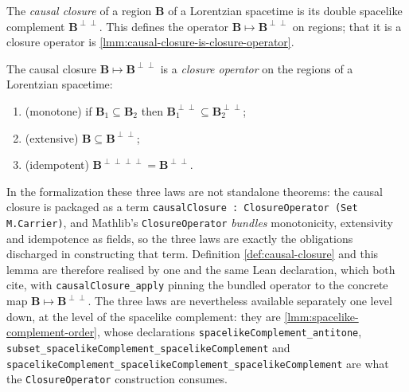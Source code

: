 \medskip

\begin{definition}
    \label{def:causal-closure}
    \leanok
    The \emph{causal closure} of a region $\mathbf{B}$ of a Lorentzian spacetime is its double spacelike complement $\mathbf{B}^{\perp\perp}$. This defines the operator $\mathbf{B} \mapsto \mathbf{B}^{\perp\perp}$ on regions; that it is a closure operator is \ref{lmm:causal-closure-is-closure-operator}.
\end{definition}

\medskip

\begin{lemma}
    \label{lmm:causal-closure-is-closure-operator}
    \leanok
    The causal closure $\mathbf{B} \mapsto \mathbf{B}^{\perp\perp}$ is a \emph{closure operator} on the regions of a Lorentzian spacetime:
    \begin{enumerate}
        \item (monotone) if $\mathbf{B}_1 \subseteq \mathbf{B}_2$ then $\mathbf{B}_1^{\perp\perp} \subseteq \mathbf{B}_2^{\perp\perp}$;
        \item (extensive) $\mathbf{B} \subseteq \mathbf{B}^{\perp\perp}$;
        \item (idempotent) $\mathbf{B}^{\perp\perp\perp\perp} = \mathbf{B}^{\perp\perp}$.
    \end{enumerate}
    In the formalization these three laws are not standalone theorems: the causal closure is packaged as a term \texttt{causalClosure : ClosureOperator (Set M.Carrier)}, and Mathlib's \texttt{ClosureOperator} \emph{bundles} monotonicity, extensivity and idempotence as fields, so the three laws are exactly the obligations discharged in constructing that term. Definition \ref{def:causal-closure} and this lemma are therefore realised by one and the same Lean declaration, which both cite, with \texttt{causalClosure\_apply} pinning the bundled operator to the concrete map $\mathbf{B} \mapsto \mathbf{B}^{\perp\perp}$. The three laws are nevertheless available separately one level down, at the level of the spacelike complement: they are \ref{lmm:spacelike-complement-order}, whose declarations \texttt{spacelikeComplement\_antitone}, \texttt{subset\_spacelikeComplement\_spacelikeComplement} and \texttt{spacelikeComplement\_spacelikeComplement\_spacelikeComplement} are what the \texttt{ClosureOperator} construction consumes.
\end{lemma}
